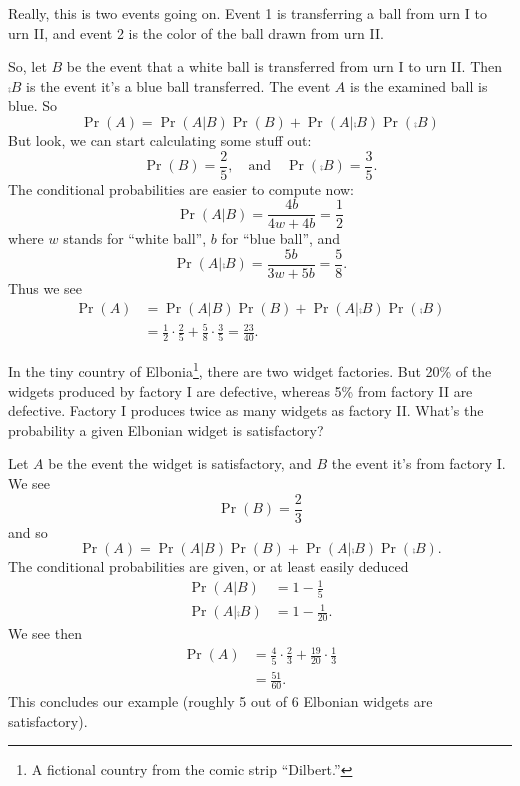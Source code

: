  Really, this is two events going on. Event 1 is
transferring a ball from urn I to urn II, and event 2 is the color of
the ball drawn from urn II. 

So, let $B$ be the event that a white ball is transferred from urn I to
urn II. Then $\comp{B}$ is the event it's a blue ball transferred. The
event $A$ is the examined ball is blue. So
\begin{equation}
\Pr(A)=\Pr(A|B)\Pr(B)+\Pr(A|\comp{B})\Pr(\comp{B})
\end{equation}
But look, we can start calculating some stuff out:
\begin{equation}
\Pr(B) = \frac{2}{5},\quad\mbox{and}\quad\Pr(\comp{B})=\frac{3}{5}.
\end{equation}
The conditional probabilities are easier to compute now:
\begin{equation}
\Pr(A|B)=\frac{4b}{4w+4b}=\frac{1}{2}
\end{equation}
where $w$ stands for ``white ball'', $b$ for ``blue ball'', and
\begin{equation}
\Pr(A|\comp{B})=\frac{5b}{3w+5b}=\frac{5}{8}.
\end{equation}
Thus we see
\begin{subequations}
\begin{align}
\Pr(A)&=\Pr(A|B)\Pr(B)+\Pr(A|\comp{B})\Pr(\comp{B})\\
&=\frac{1}{2}\cdot\frac{2}{5}+\frac{5}{8}\cdot\frac{3}{5}=\frac{23}{40}.
\end{align}
\end{subequations}

In the tiny country of Elbonia\footnote{A fictional country from the
comic strip ``Dilbert.''}, there are two widget factories. But 20\%
of the widgets produced by factory I are defective, whereas 5\% from
factory II are defective. Factory I produces twice as many widgets as
factory II. What's the probability a given Elbonian widget is
satisfactory?

Let $A$ be the event the widget is satisfactory, and $B$
the event it's from factory I. We see
\begin{equation}
\Pr(B)=\frac{2}{3}
\end{equation}
and so
\begin{equation}
\Pr(A)=\Pr(A|B)\Pr(B)+\Pr(A|\comp{B})\Pr(\comp{B}).
\end{equation}
The conditional probabilities are given, or at least easily deduced
\begin{subequations}
\begin{align}
\Pr(A|B)&=1-\frac{1}{5}\\
\Pr(A|\comp{B})&=1-\frac{1}{20}.
\end{align}
\end{subequations}
We see then
\begin{equation}
\begin{split}
\Pr(A)&=\frac{4}{5}\cdot\frac{2}{3}+\frac{19}{20}\cdot\frac{1}{3}\\
&=\frac{51}{60}.
\end{split}
\end{equation}
This concludes our example (roughly 5 out of 6 Elbonian widgets are
satisfactory). 


